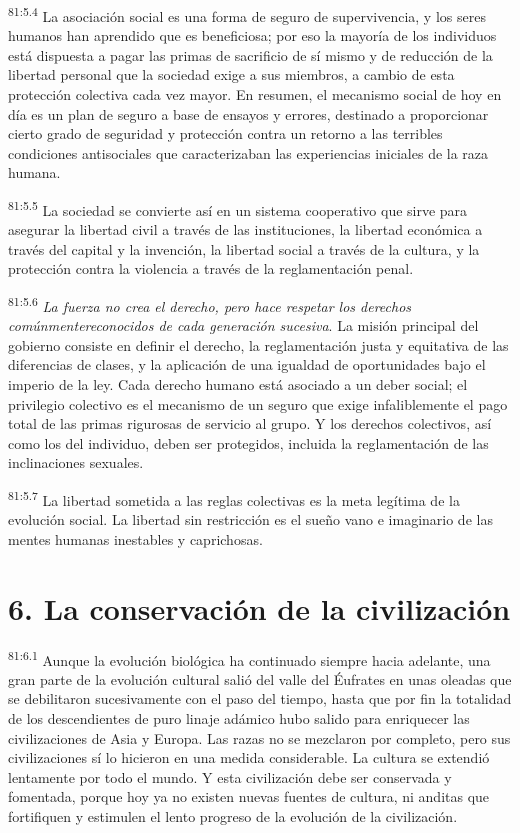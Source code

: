 \par
\textsuperscript{81:5.4} La asociación social es una forma de seguro de supervivencia, y los seres humanos han aprendido que es beneficiosa; por eso la mayoría de los individuos está dispuesta a pagar las primas de sacrificio de sí mismo y de reducción de la libertad personal que la sociedad exige a sus miembros, a cambio de esta protección colectiva cada vez mayor. En resumen, el mecanismo social de hoy en día es un plan de seguro a base de ensayos y errores, destinado a proporcionar cierto grado de seguridad y protección contra un retorno a las terribles condiciones antisociales que caracterizaban las experiencias iniciales de la raza humana.

\par
\textsuperscript{81:5.5} La sociedad se convierte así en un sistema cooperativo que sirve para asegurar la libertad civil a través de las instituciones, la libertad económica a través del capital y la invención, la libertad social a través de la cultura, y la protección contra la violencia a través de la reglamentación penal.

\par
\textsuperscript{81:5.6} \textit{La fuerza no crea el derecho, pero hace respetar los derechos comúnmentereconocidos de cada generación sucesiva}. La misión principal del gobierno consiste en definir el derecho, la reglamentación justa y equitativa de las diferencias de clases, y la aplicación de una igualdad de oportunidades bajo el imperio de la ley. Cada derecho humano está asociado a un deber social; el privilegio colectivo es el mecanismo de un seguro que exige infaliblemente el pago total de las primas rigurosas de servicio al grupo. Y los derechos colectivos, así como los del individuo, deben ser protegidos, incluida la reglamentación de las inclinaciones sexuales.

\par
\textsuperscript{81:5.7} La libertad sometida a las reglas colectivas es la meta legítima de la evolución social. La libertad sin restricción es el sueño vano e imaginario de las mentes humanas inestables y caprichosas.

\section*{6. La conservación de la civilización}
\par
\textsuperscript{81:6.1} Aunque la evolución biológica ha continuado siempre hacia adelante, una gran parte de la evolución cultural salió del valle del Éufrates en unas oleadas que se debilitaron sucesivamente con el paso del tiempo, hasta que por fin la totalidad de los descendientes de puro linaje adámico hubo salido para enriquecer las civilizaciones de Asia y Europa. Las razas no se mezclaron por completo, pero sus civilizaciones sí lo hicieron en una medida considerable. La cultura se extendió lentamente por todo el mundo. Y esta civilización debe ser conservada y fomentada, porque hoy ya no existen nuevas fuentes de cultura, ni anditas que fortifiquen y estimulen el lento progreso de la evolución de la civilización.

